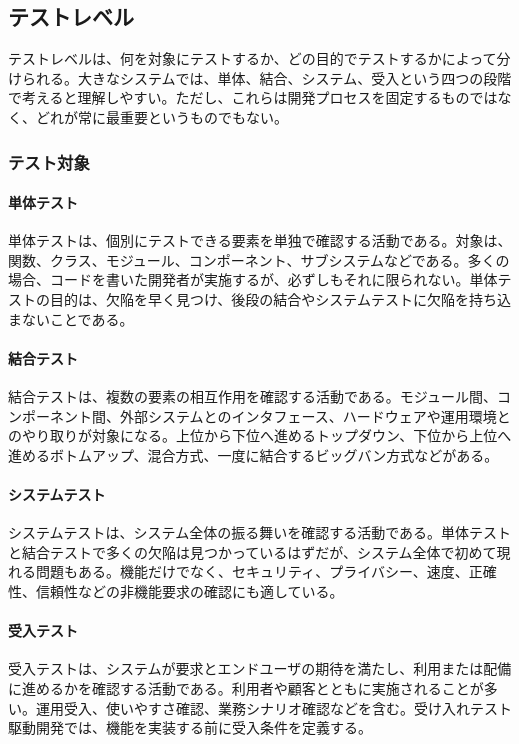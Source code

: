 \documentclass[a4paper,11pt]{ltjsarticle}
\numberwithin{figure}{section}
\numberwithin{table}{section}
\begin{document}
\subsection{テストレベル}
テストレベルは、何を対象にテストするか、どの目的でテストするかによって分けられる。大きなシステムでは、単体、結合、システム、受入という四つの段階で考えると理解しやすい。ただし、これらは開発プロセスを固定するものではなく、どれが常に最重要というものでもない。

\subsubsection{テスト対象}
\paragraph{単体テスト}
単体テストは、個別にテストできる要素を単独で確認する活動である。対象は、関数、クラス、モジュール、コンポーネント、サブシステムなどである。多くの場合、コードを書いた開発者が実施するが、必ずしもそれに限られない。単体テストの目的は、欠陥を早く見つけ、後段の結合やシステムテストに欠陥を持ち込まないことである。

\paragraph{結合テスト}
結合テストは、複数の要素の相互作用を確認する活動である。モジュール間、コンポーネント間、外部システムとのインタフェース、ハードウェアや運用環境とのやり取りが対象になる。上位から下位へ進めるトップダウン、下位から上位へ進めるボトムアップ、混合方式、一度に結合するビッグバン方式などがある。

\paragraph{システムテスト}
システムテストは、システム全体の振る舞いを確認する活動である。単体テストと結合テストで多くの欠陥は見つかっているはずだが、システム全体で初めて現れる問題もある。機能だけでなく、セキュリティ、プライバシー、速度、正確性、信頼性などの非機能要求の確認にも適している。

\paragraph{受入テスト}
受入テストは、システムが要求とエンドユーザの期待を満たし、利用または配備に進めるかを確認する活動である。利用者や顧客とともに実施されることが多い。運用受入、使いやすさ確認、業務シナリオ確認などを含む。受け入れテスト駆動開発では、機能を実装する前に受入条件を定義する。
\end{document}
